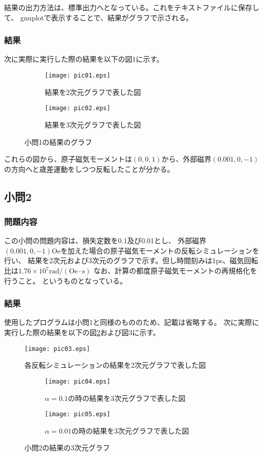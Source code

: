 \documentclass{jsarticle}
\begin{document}
結果の出力方法は、標準出力へとなっている。これをテキストファイルに保存して、
gnuplotで表示することで、結果がグラフで示される。

\subsubsection{結果}
次に実際に実行した際の結果を以下の図1に示す。
\begin{figure}[H]
	\centering
	\begin{subfigure}{0.49\columnwidth}
		\centering
		\texttt{[image: pic01.eps]}
		\caption{結果を2次元グラフで表した図}
	\end{subfigure}
	\begin{subfigure}{0.49\columnwidth}
		\centering
		\texttt{[image: pic02.eps]}
		\caption{結果を3次元グラフで表した図}
	\end{subfigure}
	\label{fig01}
	\caption{小問1の結果のグラフ}
\end{figure}

これらの図から、原子磁気モーメントは$(0,0,1)$から、外部磁界$(0.001,0,-1)$の方向へと歳差運動をしつつ反転したことが分かる。

\subsection{小問2}
\subsubsection{問題内容}
この小問の問題内容は、損失定数を0.1及び0.01とし、
外部磁界$(0.001,0,-1)\mathrm{Oe}$を加えた場合の原子磁気モーメントの反転シミュレーションを行い、
結果を2次元および3次元のグラフで示す。但し時間刻みは1ps、磁気回転比は$1.76\times10^7\mathrm{rad/(Oe\cdot s)}$
なお、計算の都度原子磁気モーメントの再規格化を行うこと。
というものとなっている。

\subsubsection{結果}
使用したプログラムは小問1と同様のもののため、記載は省略する。
次に実際に実行した際の結果を以下の図\ref{fig02}および図3に示す。
\begin{figure}[H]
	\centering
	\texttt{[image: pic03.eps]}
	\caption{各反転シミュレーションの結果を2次元グラフで表した図}
	\label{fig02}
\end{figure}
\begin{figure}[H]
	\centering
	\begin{subfigure}{0.49\columnwidth}
		\centering
		\texttt{[image: pic04.eps]}
		\caption{$\alpha=0.1$の時の結果を3次元グラフで表した図}
	\end{subfigure}
	\begin{subfigure}{0.49\columnwidth}
		\centering
		\texttt{[image: pic05.eps]}
		\caption{$\alpha=0.01$の時の結果を3次元グラフで表した図}
	\end{subfigure}
	\label{fig03}
	\caption{小問2の結果の3次元グラフ}
\end{figure}
\end{document}
